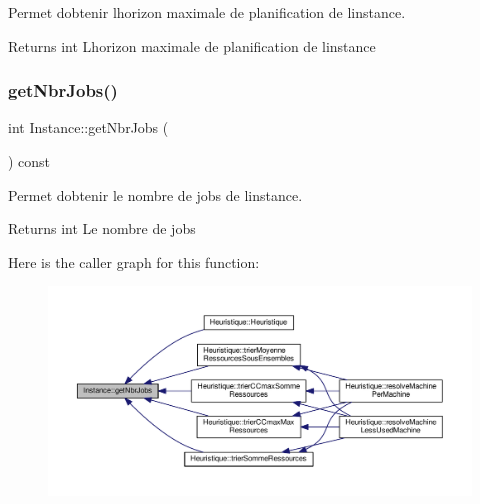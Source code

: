 Permet d\textquotesingle{}obtenir l\textquotesingle{}horizon maximale de planification de l\textquotesingle{}instance. 

\begin{DoxyReturn}{Returns}
int L\textquotesingle{}horizon maximale de planification de l\textquotesingle{}instance 
\end{DoxyReturn}
\mbox{\label{classInstance_ad81a535d52b45496e795ea48ed8ce020}} 
\subsubsection{\texorpdfstring{get\+Nbr\+Jobs()}{getNbrJobs()}}
{\footnotesize\ttfamily int Instance\+::get\+Nbr\+Jobs (\begin{DoxyParamCaption}{ }\end{DoxyParamCaption}) const}



Permet d\textquotesingle{}obtenir le nombre de jobs de l\textquotesingle{}instance. 

\begin{DoxyReturn}{Returns}
int Le nombre de jobs 
\end{DoxyReturn}
Here is the caller graph for this function\+:\nopagebreak
\begin{figure}[H]
\begin{center}
\leavevmode
\includegraphics[width=350pt]{classInstance_ad81a535d52b45496e795ea48ed8ce020_icgraph}
\end{center}
\end{figure}
\mbox{\label{classInstance_a7151797f760b20d6fc3be88ecb7b2a4b}} 
